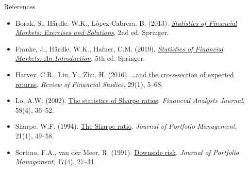 \begin{frame}{References}
\itemsize{\tiny}
\begin{itemize}
    \item Borak, S., Härdle, W.K., López-Cabrera, B. (2013). \href{https://doi.org/10.1007/978-3-642-33929-5}{\textit{Statistics of Financial Markets: Exercises and Solutions}}, 2nd ed. Springer.
    \item Franke, J., Härdle, W.K., Hafner, C.M. (2019). \href{https://doi.org/10.1007/978-3-030-13751-9}{\textit{Statistics of Financial Markets: An Introduction}}, 5th ed. Springer.
    \item Harvey, C.R., Liu, Y., Zhu, H. (2016). \href{https://doi.org/10.1093/rfs/hhv059}{\ldots and the cross-section of expected returns}. \textit{Review of Financial Studies}, 29(1), 5--68.
    \item Lo, A.W. (2002). \href{https://doi.org/10.2469/faj.v58.n4.2453}{The statistics of Sharpe ratios}. \textit{Financial Analysts Journal}, 58(4), 36--52.
    \item Sharpe, W.F. (1994). \href{https://doi.org/10.3905/jpm.1994.409501}{The Sharpe ratio}. \textit{Journal of Portfolio Management}, 21(1), 49--58.
    \item Sortino, F.A., van der Meer, R. (1991). \href{https://doi.org/10.3905/jpm.1991.409343}{Downside risk}. \textit{Journal of Portfolio Management}, 17(4), 27--31.
\end{itemize}
\end{frame}


